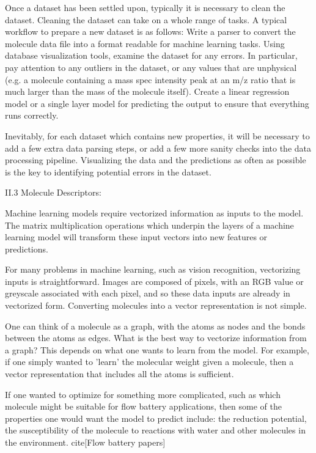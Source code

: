 Once a dataset has been settled upon, typically it is necessary to clean the dataset. Cleaning the dataset can take on a whole range of tasks. A typical workflow to prepare a new dataset is as follows:
Write a parser to convert the molecule data file into a format readable for machine learning tasks.
Using database visualization tools, examine the dataset for any errors. In particular, pay attention to any outliers in the dataset, or any values that are unphysical (e.g. a molecule containing a mass spec intensity peak at an m/z ratio that is much larger than the mass of the molecule itself).
Create a linear regression model or a single layer model for predicting the output to ensure that everything runs correctly.

Inevitably, for each dataset which contains new properties, it will be necessary to add a few extra data parsing steps, or add a few more sanity checks into the data processing pipeline. Visualizing the data and the predictions as often as possible is the key to identifying potential errors in the dataset.

II.3 Molecule Descriptors:

Machine learning models require vectorized information as inputs to the model. The matrix multiplication operations which underpin the layers of a machine learning model will transform these input vectors into new features or predictions.

For many problems in machine learning, such as vision recognition, vectorizing inputs is straightforward. Images are composed of pixels, with an RGB value or greyscale associated with each pixel, and so these data inputs are already in vectorized form. Converting molecules into a vector representation is not simple. 

One can think of a molecule as a graph, with the atoms as nodes and the bonds between the atoms as edges. What is the best way to vectorize information from a graph? This depends on what one wants to learn from the model. For example, if one simply wanted to 'learn' the molecular weight given a molecule, then a vector representation that includes all the atoms is sufficient.

If one wanted to optimize for something more complicated, such as which molecule might be suitable for  flow battery applications, then some of the properties one would want the model to predict include: the reduction potential, the susceptibility of the molecule to reactions with water and other molecules in the environment. cite[Flow battery papers]

